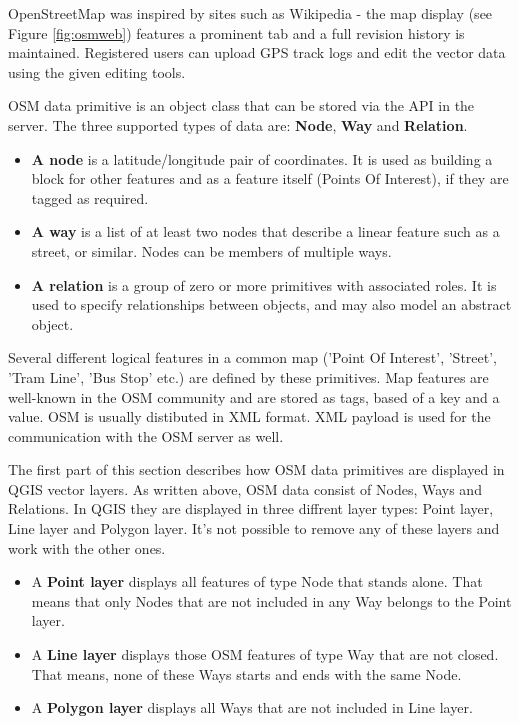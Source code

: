 OpenStreetMap was inspired by sites such as Wikipedia - the map display 
(see Figure \ref{fig:osmweb}) features a prominent  tab and a 
full revision history is maintained. Registered users can upload GPS track 
logs and edit the vector data using the given editing tools.

OSM data primitive is an object class that can be stored via the API in the
server. The three supported types of data are: \textbf{Node}, \textbf{Way} 
and \textbf{Relation}. 

\begin{itemize}
\item \textbf{A node} is a latitude/longitude pair of coordinates. It is 
used as building a block for other features and as a feature itself (Points 
Of Interest), if they are tagged as required. 
\item \textbf{A way} is a list of at least two nodes that describe a linear
feature such as a street, or similar. Nodes can be members of multiple ways.
\item \textbf{A relation} is a group of zero or more primitives with 
associated roles. It is used to specify relationships between objects, 
and may also model an abstract object. 
\end{itemize}

Several different logical features in a common map ('Point Of Interest',
'Street', 'Tram Line', 'Bus Stop' etc.) are defined by these primitives. 
Map features are well-known in the OSM community and are stored as tags, 
based of a key and a value. OSM is usually distibuted in XML format. XML 
payload is used for the communication with the OSM server as well.

\label{qgis-osm-connection}

The first part of this section describes how OSM data primitives 
are displayed in QGIS vector layers. As written above, OSM data consist of 
Nodes, Ways and Relations. In QGIS they are displayed in three diffrent 
layer types: Point layer, Line layer and Polygon layer. It's not possible 
to remove any of these layers and work with the other ones.

\begin{itemize}
\item A \textbf{Point layer} displays all features of type Node that stands 
alone. That means that only Nodes that are not included in any Way belongs 
to the Point layer.
\item A \textbf{Line layer} displays those OSM features of type Way that are 
not closed. That means, none of these Ways starts and ends with the 
same Node.
\item A \textbf{Polygon layer} displays all Ways that are not included in 
Line layer.
\end{itemize}

